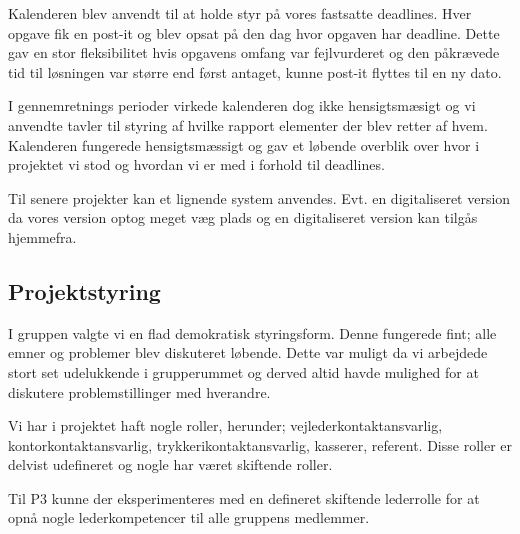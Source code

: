 Kalenderen blev anvendt til at holde styr p\aa{} vores fastsatte deadlines. Hver opgave fik en post-it og blev opsat p\aa{} den dag hvor opgaven har deadline. Dette gav en stor fleksibilitet hvis opgavens omfang var fejlvurderet og den p\aa{}kr\ae{}vede tid til l\o{}sningen var st\o{}rre end f\o{}rst antaget, kunne post-it flyttes til en ny dato. 
 
I gennemretnings perioder virkede kalenderen dog ikke hensigtsm\ae{}sigt og vi anvendte tavler til styring af hvilke rapport elementer der blev retter af hvem. 
Kalenderen fungerede hensigtsm\ae{}ssigt og gav et l\o{}bende overblik over hvor i projektet vi stod og hvordan vi er med i forhold til deadlines. 

Til senere projekter kan et lignende system anvendes. Evt. en digitaliseret version da vores version optog meget v\ae{}g plads og en digitaliseret version kan tilg\aa{}s hjemmefra. 

\subsection{Projektstyring}
I gruppen valgte vi en flad demokratisk styringsform. Denne fungerede fint; alle emner og problemer blev diskuteret l\o{}bende. Dette var muligt da vi arbejdede stort set udelukkende i grupperummet og derved altid havde mulighed for at diskutere problemstillinger med hverandre. 

Vi har i projektet haft nogle roller, herunder; vejlederkontaktansvarlig, kontorkontaktansvarlig, trykkerikontaktansvarlig, kasserer, referent. Disse roller er delvist udefineret og nogle har v\ae{}ret skiftende roller.

Til P3 kunne der eksperimenteres med en defineret skiftende lederrolle for at opn\aa{} nogle lederkompetencer til alle gruppens medlemmer. 






